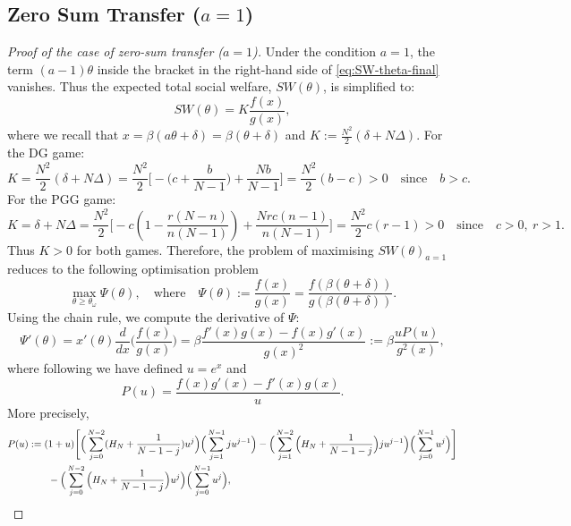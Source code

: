 \documentclass{article}
\begin{document}
\subsection{Zero Sum Transfer (\texorpdfstring{$a=1$}{a=1})}
\begin{proof}[Proof of the case of zero-sum transfer ($a=1$)]
Under the condition $a=1$, the term $(a-1)\theta$ inside the bracket in the right-hand side of \eqref{eq:SW-theta-final} vanishes. Thus the expected total social welfare, $SW(\theta)$, is simplified to:
\[
SW(\theta)= K  \frac{f(x)}{g(x)},
\]
where we recall that $x=\beta(a\theta+\delta)=\beta(\theta+\delta)$ and $K:= \frac{N^2}{2} (\delta + N\Delta)$. 
For the DG game:
\begin{equation*}
K=\frac{N^2}{2}(\delta+N\Delta)=\frac{N^2}{2}\Bigg[-\Big(c+\frac{b}{N-1}\Big)+\frac{N b}{N-1}\Bigg]=\frac{N^2}{2}(b-c)>0\quad \text{since}\quad b>c.    
\end{equation*}
For the PGG game:
\begin{equation*}
K= \delta+N\Delta=\frac{N^2}{2}\Bigg[-c \left(1 - \frac{r(N-n)}{n(N-1)} \right)+\frac{N rc(n-1)}{n(N-1)}\Bigg]=\frac{N^2}{2} c(r-1)>0\quad\text{since}\quad c>0,~ r>1.
\end{equation*}
Thus $K>0$ for both games.
Therefore, the problem of maximising $SW(\theta)_{a=1}$ reduces to the following optimisation problem
\[
\max_{\theta\geq \theta_\omega}\Psi(\theta),\quad\text{where}\quad\Psi(\theta):=\frac{f(x)}{g(x)}=\frac{f(\beta(\theta+\delta))}{g(\beta(\theta+\delta))}. 
\]
Using the chain rule, we compute the derivative of $\Psi$:
\begin{equation}
\label{eq: derivative Psi}
\Psi'(\theta)=x'(\theta)\frac{d}{dx}\Big(\frac{f(x)}{g(x)}\Big)=\beta\frac{f'(x)g(x)-f(x)g'(x)}{g(x)^2}:=\beta\frac{u P(u)}{g^2(x)},    
\end{equation}
where following \cite{duonghan2021cost} we have defined $u= e^x$ and
\begin{equation}
P(u) = \dfrac{f(x)g'(x)-f'(x)g(x)}{u}.    
\end{equation}
More precisely,
\begin{align}
\label{eq: def of P}
P(u)&:=(1+u)\Bigg[\Big(\sum_{j=0}^{N-2}(H_N+\frac{1}{N-1-j}) u^j\Big)\Big(\sum_{j=1}^{N-1} j u^{j-1}\Big)-\Big(\sum_{j=1}^{N-2}\Big(H_N + \frac{1}{N-1-j}\Big) j u^{j-1}\Big)\Big(\sum_{j=0}^{N-1}u^j\Big)\Bigg]\notag
\\&\qquad-\Big(\sum_{j=0}^{N-2}\Big(H_N + \frac{1}{N-1-j}\Big) u^j\Big)\Big(\sum_{j=0}^{N-1}u^j\Big),
\end{align}

\end{proof}
\end{document}
